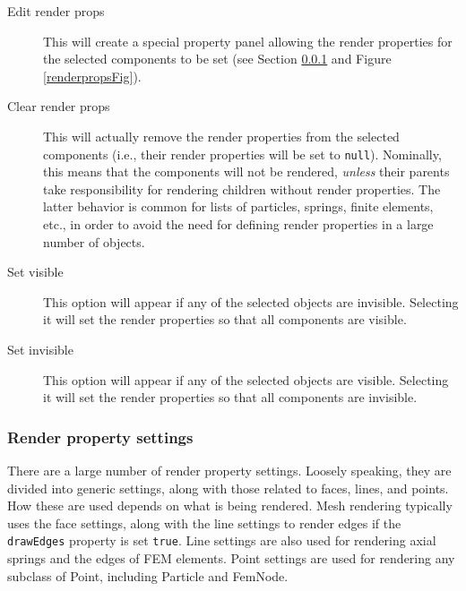 \documentclass{article}
\begin{document}
\begin{description}

\item[Edit render props]\mbox{}

This will create a special property panel allowing the render properties for
the selected components to be set (see Section \ref{renderPropSettingsSec}
and Figure \ref{renderpropsFig}).

\item[Clear render props]\mbox{}

This will actually remove the render properties
from the selected components (i.e., their render properties will be
set to {\tt null}).  Nominally, this means that the components will not be
rendered, {\it unless} their parents take responsibility for rendering
children without render properties. The latter behavior is common for
lists of particles, springs, finite elements, etc., in order to
avoid the need for defining render properties in a large number
of objects.

\item[Set visible]\mbox{}

This option will appear if any of the selected objects are
invisible. Selecting it will set the render properties so
that all components are visible.

\item[Set invisible]\mbox{}

This option will appear if any of the selected objects are
visible. Selecting it will set the render properties so
that all components are invisible.

\end{description}

\subsubsection{Render property settings}
\label{renderPropSettingsSec}

There are a large number of render property settings. Loosely
speaking, they are divided into generic settings, along with those
related to faces, lines, and points. How these are used depends on
what is being rendered. Mesh rendering typically uses the face
settings, along with the line settings to render edges if the
{\tt drawEdges} property is set {\tt true}.  Line settings are also used for
rendering axial springs and the edges of FEM elements.  Point settings
are used for rendering any subclass of Point, including Particle and
FemNode. 
\end{document}
